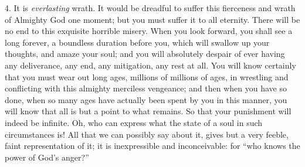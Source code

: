 \documentclass[
]{book}
\begin{document}
4. It is \emph{everlasting} wrath. It would be dreadful to suffer this fierceness and wrath of Almighty God one moment; but you must suffer it to all eternity. There will be no end to this exquisite horrible misery. When you look forward, you shall see a long forever, a boundless duration before you, which will swallow up your thoughts, and amaze your soul; and you will absolutely despair of ever having any deliverance, any end, any mitigation, any rest at all. You will know certainly that you must wear out long ages, millions of millions of ages, in wrestling and conflicting with this almighty merciless vengeance; and then when you have so done, when so many ages have actually been spent by you in this manner, you will know that all is but a point to what remains. So that your punishment will indeed be infinite. Oh, who can express what the state of a soul in such circumstances is! All that we can possibly say about it, gives but a very feeble, faint representation of it; it is inexpressible and inconceivable: for ``who knows the power of God's anger?''
\end{document}
